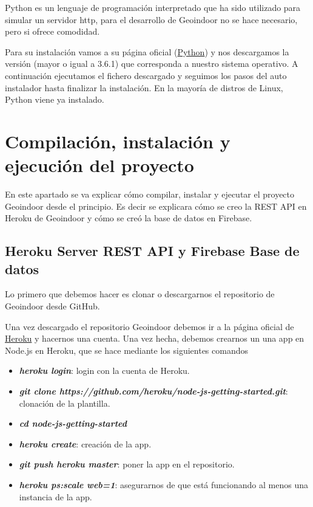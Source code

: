 Python es un lenguaje de programación interpretado que ha sido utilizado para simular un servidor http, para el desarrollo de Geoindoor no se hace necesario, pero si ofrece comodidad.

Para su instalación vamos a su página oficial (\href{https://www.python.org/downloads/}{Python}) y nos descargamos la versión (mayor o igual a 3.6.1) que corresponda a nuestro sistema operativo. A continuación ejecutamos el fichero descargado y seguimos los pasos del auto instalador hasta finalizar la instalación. En la mayoría de distros de Linux, Python viene ya instalado.



\section{Compilación, instalación y ejecución del proyecto}
En este apartado se va explicar cómo compilar, instalar y ejecutar el proyecto Geoindoor desde el principio. Es decir se explicara cómo se creo la REST API en Heroku de Geoindoor y cómo se creó la base de datos en Firebase.


\subsection{Heroku Server REST API y Firebase Base de datos}

Lo primero que debemos hacer es clonar o descargarnos el repositorio de Geoindoor desde GitHub.


Una vez descargado el repositorio Geoindoor debemos ir a la página oficial de \href{https://id.heroku.com/login}{Heroku} y hacernos una cuenta. Una vez hecha, debemos crearnos un una app en Node.js en Heroku, que se hace mediante los siguientes comandos

\begin{itemize}
	\item \textbf{\textit{heroku login}}: login con la cuenta de Heroku.
	\item \textbf{\textit{git clone https://github.com/heroku/node-js-getting-started.git}}: clonación de la plantilla.
	\item \textbf{\textit{cd node-js-getting-started}}
	\item \textbf{\textit{heroku create}}: creación de la app.
	\item \textbf{\textit{git push heroku master}}: poner la app en el repositorio.
	\item \textbf{\textit{heroku ps:scale web=1}}: asegurarnos de que está funcionando al menos una instancia de la app.
\end{itemize}

